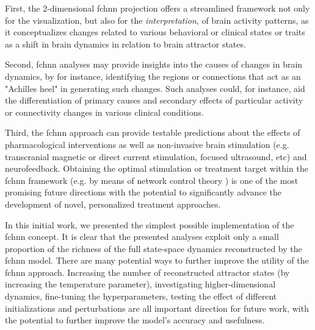 \documentclass{article}
\begin{document}
First, the 2-dimensional \acrshort{fchnn} projection offers a streamlined framework not only for the visualization, but also for the \textit{interpretation}, of brain activity patterns, as it conceptualizes changes related to various behavioral or clinical states or traits as a shift in brain dynamics in relation to brain attractor states.

Second, \acrshort{fchnn} analyses may provide insights into the causes of changes in brain dynamics, by for instance, identifying the regions or connections that act as an "Achilles heel" in generating such changes. Such analyses could, for instance, aid the differentiation of primary causes and secondary effects of particular activity or connectivity changes in various clinical conditions.

Third, the \acrshort{fchnn} approach can provide testable predictions about the effects of pharmacological interventions as well as non-invasive brain stimulation (e.g. transcranial magnetic or direct current stimulation, focused ultrasound, etc) and neurofeedback. Obtaining the optimal stimulation or treatment target within the \acrshort{fchnn} framework (e.g. by means of network control theory \citep{liu2011controllability}) is one of the most promising future directions with the potential to significantly advance the development of novel, personalized treatment approaches.

In this initial work, we presented the simplest possible implementation of the \acrshort{fchnn} concept. It is clear that the presented analyses exploit only a small proportion of the richness of the full state-space dynamics reconstructed by the \acrshort{fchnn} model.
There are many potential ways to further improve the utility of the \acrshort{fchnn} approach. Increasing the number of reconstructed attractor states (by increasing the temperature parameter), investigating higher-dimensional dynamics, fine-tuning the hyperparameters, testing the effect of different initializations and perturbations are all important direction for future work, with the potential to further improve the model's accuracy and usefulness.

\end{document}
